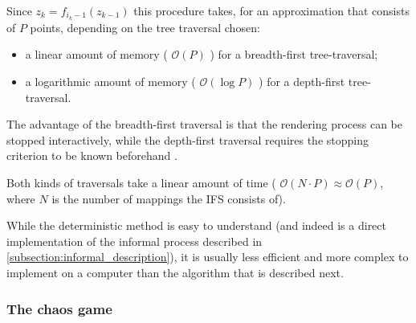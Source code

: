 \documentclass[11pt]{article}
\begin{document}
Since \(z_{k} = f_{i_k-1}(z_{k-1})\) this procedure takes, for an approximation that consists of \(P\) points, depending on the tree traversal chosen:

\begin{itemize}
\item a linear amount of memory ( \(\mathcal{O}(P)\) ) for a breadth-first tree-traversal;
\item a logarithmic amount of memory ( \(\mathcal{O}(\log{P})\) ) for a depth-first tree-traversal.
\end{itemize}


The advantage of the breadth-first traversal is that the rendering process can be stopped interactively,
while the depth-first traversal requires the stopping criterion to be known beforehand \cite{hepting1991rendering}.

Both kinds of traversals take a linear amount of time ( \(\mathcal{O}(N \cdot P) \approx \mathcal{O}(P)\), where \(N\) is the number of mappings the IFS consists of).

While the deterministic method is easy to understand (and indeed is a direct implementation of the informal process described in \autoref{subsection:informal_description}),
it is usually less efficient and more complex to implement on a computer than the algorithm that is described next.


\subsubsection{The chaos game}
\label{sec:orgd925052}
\label{subsection:chaos_game}
\end{document}
